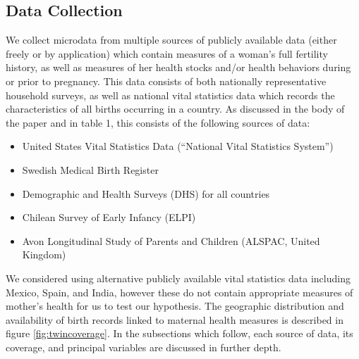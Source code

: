 \documentclass{nature}
\begin{document}
\begin{linenumbers}
\subsection{Data Collection}
We collect microdata from multiple sources of publicly available data (either freely or by application) which contain measures of a woman's full fertility history, as well as measures of her health stocks and/or health behaviors during or prior to pregnancy.  This data consists of both nationally representative household surveys, as well as national vital statistics data which records the characteristics of all births occurring in a country.  As discussed in the body of the paper and in table 1, this consists of the following sources of data:
\begin{itemize}
\item United States Vital Statistics Data (``National Vital Statistics System'')
\item Swedish Medical Birth Register
\item Demographic and Health Surveys (DHS) for all countries
\item Chilean Survey of Early Infancy (ELPI)
\item Avon Longitudinal Study of Parents and Children (ALSPAC, United Kingdom)
\end{itemize}
We considered using alternative publicly available vital statistics data including Mexico, Spain, and India, however these do not contain appropriate measures of mother's health for us to test our hypothesis.  The geographic distribution and availability of birth records linked to maternal health measures is described in figure \ref{fig:twincoverage}.  In the subsections which follow, each source of data, its coverage, and principal variables are discussed in further depth.


\end{linenumbers}
\end{document}
